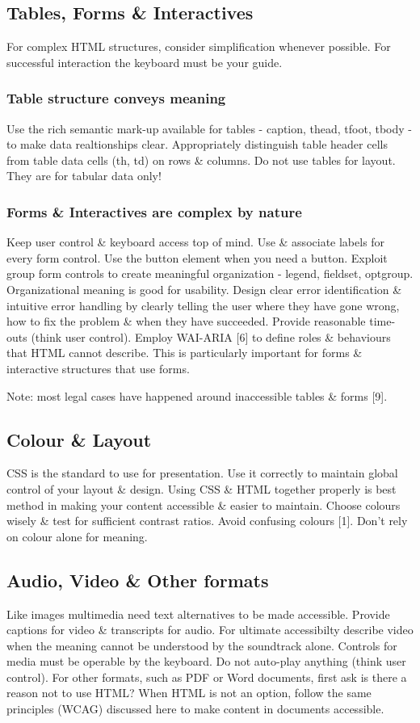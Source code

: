\documentclass{acm_proc_article-sp}
\begin{document}
\subsection{Tables, Forms \& Interactives}
For complex HTML structures, consider simplification whenever possible. For successful interaction the keyboard must be your guide.
\subsubsection{Table structure conveys meaning}
Use the rich semantic mark-up available for tables - caption, thead, tfoot, tbody - to make data realtionships clear. Appropriately distinguish table header cells from table data cells (th, td) on rows \& columns. Do not use tables for layout. They are for tabular data only!
\subsubsection{Forms \& Interactives are complex by nature}
Keep user control \& keyboard access top of mind. Use \& associate labels for every form control. Use the button element when you need a button. Exploit group form controls to create meaningful organization - legend, fieldset, optgroup. Organizational meaning is good for usability. Design clear error identification \& intuitive error handling by clearly telling the user where they have gone wrong, how to fix the problem \& when they have succeeded. Provide reasonable time-outs (think user control). Employ WAI-ARIA [6] to define roles \& behaviours that HTML cannot describe. This is particularly important for forms \& interactive structures that use forms.

Note: most legal cases have happened around inaccessible tables \& forms [9].

\subsection{Colour \& Layout}
CSS is the standard to use for presentation. Use it correctly to maintain global control of your layout \& design. Using CSS \& HTML together properly is best method in making your content accessible \& easier to maintain. Choose colours wisely \& test for sufficient contrast ratios. Avoid confusing colours [1]. Don't rely on colour alone for meaning.

\subsection{Audio, Video \& Other formats}
Like images multimedia need text alternatives to be made accessible. Provide captions for video \& transcripts for audio. For ultimate accessibilty describe video when the meaning cannot be understood by the soundtrack alone. Controls for media must be operable by the keyboard. Do not auto-play anything (think user control). For other formats, such as PDF or Word documents, first ask is there a reason not to use HTML? When HTML is not an option, follow the same principles (WCAG) discussed here to make content in documents accessible.
\end{document}
